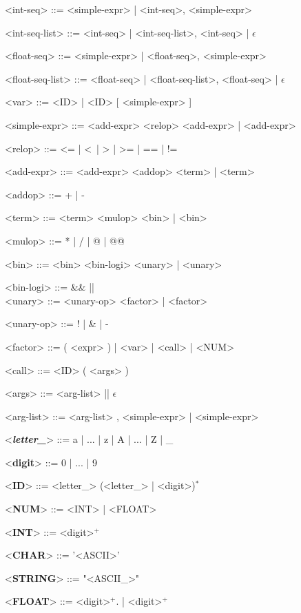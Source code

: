 \begin{grammar}
	<int-seq> ::= <simple-expr> | <int-seq>, <simple-expr>
	
	<int-seq-list> ::= {<int-seq>} | <int-seq-list>, {<int-seq>} | $\epsilon$

	<float-seq> ::= <simple-expr> | <float-seq>, <simple-expr>
		
	<float-seq-list> ::= {<float-seq>} | <float-seq-list>, {<float-seq>} | $\epsilon$
	
	<var> ::= <ID> | <ID> [ <simple-expr> ]
	
	<simple-expr> ::= <add-expr> <relop> <add-expr> | <add-expr>
	
	<relop> ::= \textless= | \textless\ | > | >= | == | !=
	
	<add-expr> ::= <add-expr> <addop> <term> | <term>
	
	<addop> ::= + | - 
	
	<term> ::= <term> <mulop> <bin> | <bin>
	
	<mulop> ::= * | / | @ | @@
	
	<bin> ::= <bin> <bin-logi> <unary> | <unary>
	
	<bin-logi> ::= \&\& \alt || \alt \^ \\
	
	<unary> ::= <unary-op> <factor> | <factor> 
	
	<unary-op> ::= ! | \& | -
	
	<factor> ::= ( <expr> ) | <var> | <call> | <NUM>
	
	<call> ::= <ID> ( <args> ) 
	
	<args> ::= <arg-list> || $\epsilon$
	
	<arg-list> ::= <arg-list> , <simple-expr> | <simple-expr>
	
	<\textbf{\textit{letter\_}}> ::= a | ... | z | A | ... | Z | \_
	
	<\textbf{digit}> ::= 0 | ... | 9
	
	<\textbf{ID}> ::= <letter\_> (<letter\_> | <digit>)$^*$
	
	<\textbf{NUM}> ::= <INT> | <FLOAT>
	
	<\textbf{INT}> ::= <digit>$^+$

	<\textbf{CHAR}> ::= '<ASCII>'
	
	<\textbf{STRING}> ::= "<ASCII_>"

	<\textbf{FLOAT}> ::= <digit>$^+$. | <digit>$^+$
	
\end{grammar}
